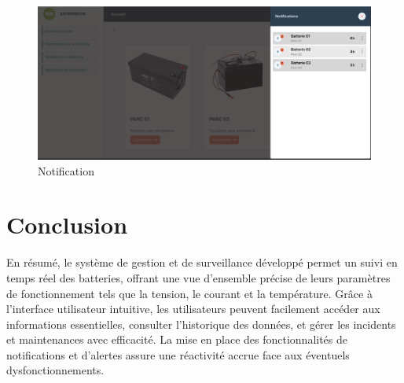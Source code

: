\begin{figure}[H]
	\centering
	\includegraphics[width=17cm]{./img/interface/notification.png}
	\caption{Notification}
	\label{fig:relais_5vdc}
\end{figure}
\section{Conclusion}

En résumé, le système de gestion et de surveillance développé permet un suivi en temps réel des batteries, offrant une vue d'ensemble précise de leurs paramètres de fonctionnement tels que la tension, le courant et la température. Grâce à l'interface utilisateur intuitive, les utilisateurs peuvent facilement accéder aux informations essentielles, consulter l'historique des données, et gérer les incidents et maintenances avec efficacité. La mise en place des fonctionnalités de notifications et d'alertes assure une réactivité accrue face aux éventuels dysfonctionnements. 


